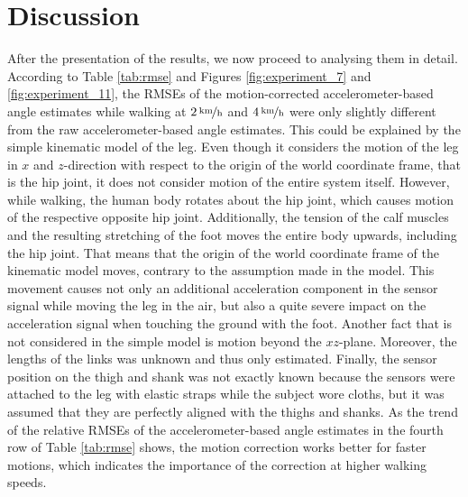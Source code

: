 \section{Discussion}

After the presentation of the results, we now proceed to analysing them in detail. According to Table \ref{tab:rmse} and Figures \ref{fig:experiment_7} and \ref{fig:experiment_11}, the RMSEs of the motion-corrected accelerometer-based angle estimates while walking at $\unitfrac[2]{km}{h}$ and $\unitfrac[4]{km}{h}$ were only slightly different from the raw accelerometer-based angle estimates. This could be explained by the simple kinematic model of the leg. Even though it considers the motion of the leg in $x$ and $z$-direction with respect to the origin of the world coordinate frame, that is the hip joint, it does not consider motion of the entire system itself. However, while walking, the human body rotates about the hip joint, which causes motion of the respective opposite hip joint. Additionally, the tension of the calf muscles and the resulting stretching of the foot moves the entire body upwards, including the hip joint. That means that the origin of the world coordinate frame of the kinematic model moves, contrary to the assumption made in the model. This movement causes not only an additional acceleration component in the sensor signal while moving the leg in the air, but also a quite severe impact on the acceleration signal when touching the ground with the foot. Another fact that is not considered in the simple model is motion beyond the $xz$-plane. Moreover, the lengths of the links was unknown and thus only estimated. Finally, the sensor position on the thigh and shank was not exactly known because the sensors were attached to the leg with elastic straps while the subject wore cloths, but it was assumed that they are perfectly aligned with the thighs and shanks. As the trend of the relative RMSEs of the accelerometer-based angle estimates in the fourth row of Table \ref{tab:rmse} shows, the motion correction works better for faster motions, which indicates the importance of the correction at higher walking speeds. 

